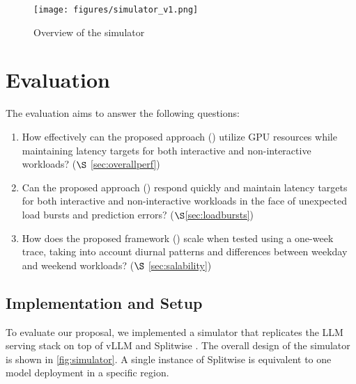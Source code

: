 \begin{figure*}[t]
    \centering
\texttt{[image: figures/simulator\_v1.png]}
    \caption{Overview of the \sys simulator 
    }
    \label{fig:simulator}
\end{figure*}

\section{Evaluation}
\label{sec:results}

The evaluation aims to answer the following questions:
\begin{enumerate}[leftmargin=*,noitemsep,topsep=0pt,parsep=0pt,partopsep=0pt]
    \item  How effectively can the proposed approach (\sys) utilize GPU resources while maintaining latency targets for both interactive and non-interactive workloads? ($\S$ \ref{sec:overallperf}) 
    \item Can the proposed approach (\sys) respond quickly and maintain latency targets for both interactive and non-interactive workloads in the face of unexpected load bursts and prediction errors? ($\S$\ref{sec:loadbursts}) 
    \item How does the proposed framework (\sys) scale when tested using a one-week trace, taking into account diurnal patterns and differences between weekday and weekend workloads?  ($\S$ \ref{sec:salability}) 

\end{enumerate}


\subsection{Implementation and Setup}
\label{sec:results:simulator}

To evaluate our proposal, we implemented a simulator that replicates the LLM serving stack on top of vLLM \cite{kwon2023efficient} and Splitwise \cite{splitwise}. The overall design of the simulator is shown in \autoref{fig:simulator}. A single instance of Splitwise  is equivalent to one model deployment in a specific region.

